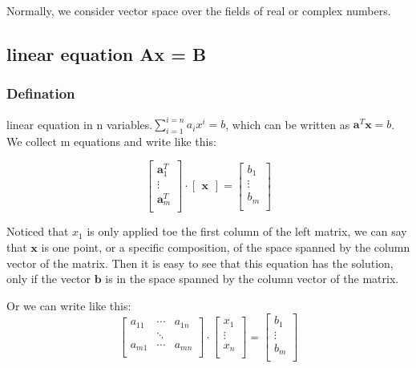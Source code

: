 \documentclass[UTF8]{../../09-Mathematics}
\begin{document}
Normally, we consider vector space over the fields of real or complex numbers.

\subsection{linear equation Ax = B}

\subsubsection{Defination}

linear equation in n variables.$\sum_{i = 1}^{i=n}a_ix^i = b$, which can be written as $\boldsymbol a^T \boldsymbol x = b$. We collect m equations and write like this:

\begin{equation}
  \begin{bmatrix}
    \boldsymbol a^T_1 \\
    \vdots \\
    \boldsymbol a^T_m \\
  \end{bmatrix}
  \cdot
  \begin{bmatrix}
    \boldsymbol x
  \end{bmatrix}
  =
  \begin{bmatrix}
     b_1 \\
    \vdots \\
     b_m \\
  \end{bmatrix}
\end{equation}

Noticed that $x_1$ is only applied toe the first column of the left matrix, we can say that $ \boldsymbol x$ is one point, or a specific composition, of the space spanned by the column vector of the matrix. Then it is easy to see that this equation has the solution, only if the vector $ \boldsymbol b$ is in the space spanned by the column vector of the matrix.


Or we can write like this:
\begin{equation}
  \begin{bmatrix}
     a_{11} & \cdots & a_{1n}\\
     & \ddots & \\
     a_{m1} & \cdots & a_{mn} \\
  \end{bmatrix}
  \cdot
  \begin{bmatrix}
    x_1 \\
    \vdots \\
    x_n \\
  \end{bmatrix}
  =
  \begin{bmatrix}
    b_1 \\
    \vdots \\
    b_m \\
  \end{bmatrix}
\end{equation}
\end{document}
